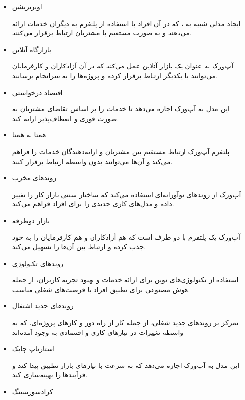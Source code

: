 \documentclass[dvipsnames, svgnames, x11names, 11pt, twocolumn]{article}
\begin{document}
\begin{itemize}
\item
اوبریزیشن

ایجاد مدلی شبیه به ، که در آن افراد با استفاده از پلتفرم به دیگران خدمات ارائه می‌دهند و به صورت مستقیم با مشتریان ارتباط برقرار می‌کنند.

\item
بازارگاه آنلاین

آپ‌ورک به عنوان یک بازار آنلاین عمل می‌کند که در آن آزادکاران و کارفرمایان می‌توانند با یکدیگر ارتباط برقرار کرده و پروژه‌ها را به سرانجام برسانند.

\item
اقتصاد درخواستی 

این مدل به آپ‌ورک اجازه می‌دهد تا خدمات را بر اساس تقاضای مشتریان به صورت فوری و انعطاف‌پذیر ارائه کند.

\item
همتا به همتا 

پلتفرم آپ‌ورک ارتباط مستقیم بین مشتریان و ارائه‌دهندگان خدمات را فراهم می‌کند و آن‌ها می‌توانند بدون واسطه ارتباط برقرار کنند.

\item
روندهای مخرب 

آپ‌ورک از روندهای نوآورانه‌ای استفاده می‌کند که ساختار سنتی بازار کار را تغییر داده و مدل‌های کاری جدیدی را برای افراد فراهم می‌کند.

\item
بازار دوطرفه

آپ‌ورک یک پلتفرم با دو طرف است که هم آزادکاران و هم کارفرمایان را به خود جذب کرده و ارتباط بین آن‌ها را تسهیل می‌کند.

\item
روندهای تکنولوژی

استفاده از تکنولوژی‌های نوین برای ارائه خدمات و بهبود تجربه کاربران، از جمله هوش مصنوعی برای تطبیق افراد با فرصت‌های شغلی مناسب.

\item
روندهای جدید اشتغال

تمرکز بر روندهای جدید شغلی، از جمله کار از راه دور و کارهای پروژه‌ای، که به واسطه تغییرات در نیازهای کاری و اقتصادی به وجود آمده‌اند.

\item
استارتاپ چابک

این مدل به آپ‌ورک اجازه می‌دهد که به سرعت با نیازهای بازار تطبیق پیدا کند و فرآیندها را بهینه‌سازی کند.

\item
کرادسورسینگ


\end{itemize}
\end{document}
